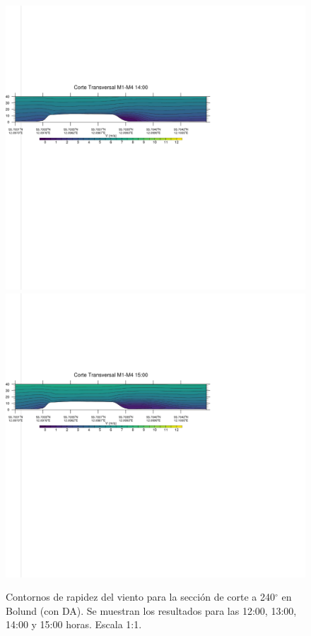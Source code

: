 \begin{figure}[H]
	\includegraphics[width=0.90\linewidth,trim={0mm 202.0mm 111mm 106mm},clip]{Imagenes/06/bol_da/1400rot}\\%
	\includegraphics[width=0.90\linewidth,trim={0mm 180.0mm 111mm 106mm},clip]{Imagenes/06/bol_da/1500rot}%
	\caption{Contornos de rapidez del viento para la sección de corte a 240$^\circ$ en Bolund (con DA). Se muestran los resultados para las 12:00, 13:00, 14:00 y 15:00 horas. Escala 1:1.}
	\label{fig:06_bol_da_cross}
\end{figure}
\vspace*{\fill}
\newpage

